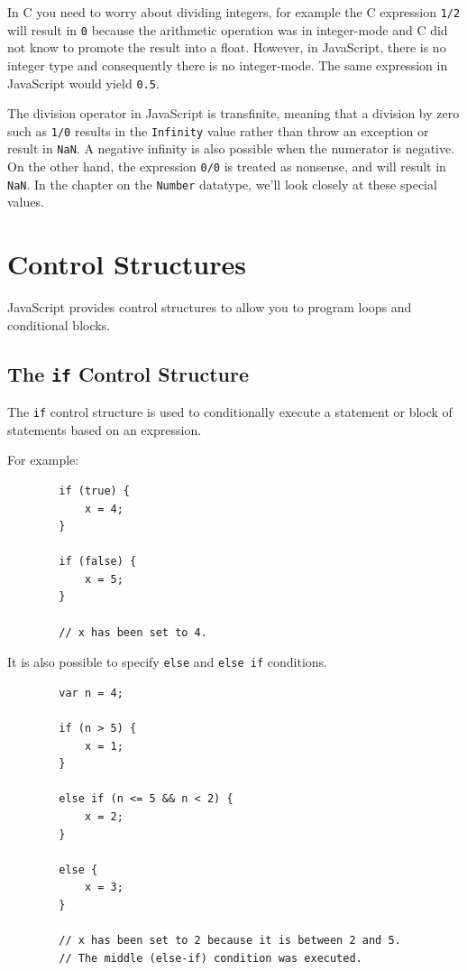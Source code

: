 \documentclass[11pt,letter]{book}
\begin{document}
    In C you need to worry about dividing integers, for example the C expression \texttt{1/2} will 
    result in \texttt{0} because the arithmetic operation was in integer-mode and C did not know to
    promote the result into a float. However, in JavaScript, there is no integer type and 
    consequently there is no integer-mode. The same expression in JavaScript would yield 
    \texttt{0.5}.
    
    The division operator in JavaScript is transfinite, meaning that a division by zero such as
    \texttt{1/0} results in the \texttt{Infinity} value rather than throw an exception or result in 
    \texttt{NaN}. A negative infinity is also possible when the numerator is negative. On the other 
    hand, the expression \texttt{0/0} is treated as nonsense, and will result in \texttt{NaN}. In 
    the chapter on the \texttt{Number} datatype, we'll look closely at these special values.
    
    \section{Control Structures}
    JavaScript provides control structures to allow you to program loops and conditional blocks.
    
    \subsection{The \texttt{if} Control Structure}
    The \texttt{if} control structure is used to conditionally execute a statement or block of 
    statements based on an expression.
    
    For example:
    
    \begin{verbatim}
        if (true) {
            x = 4;
        }
        
        if (false) {
            x = 5;
        }
        
        // x has been set to 4.
    \end{verbatim}
    
    It is also possible to specify \texttt{else} and \texttt{else if} conditions.
    
    \begin{verbatim}
        var n = 4;
        
        if (n > 5) {
            x = 1;
        }
        
        else if (n <= 5 && n < 2) {
            x = 2;
        }
        
        else {
            x = 3;
        }
        
        // x has been set to 2 because it is between 2 and 5.
        // The middle (else-if) condition was executed.
    \end{verbatim}
    
\end{document}
